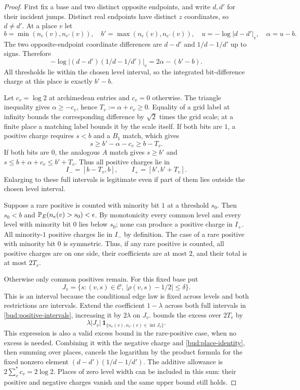 \begin{proof}
First fix a base and two distinct opposite endpoints, and write
$d,d'$ for their incident jumps.  Distinct real endpoints have
distinct $z$ coordinates, so $d\ne d'$.  At a place $v$ let
\[
 b=\min(n_e(v),n_{e'}(v)),\quad b'=\max(n_e(v),n_{e'}(v)),\quad
 u=-\log|d-d'|_v,\quad \alpha=u-b.
\]
The two opposite-endpoint coordinate differences are $d-d'$ and
$1/d-1/d'$ up to signs.  Therefore
\begin{equation}\label{bud:place-identity}
 -\log|(d-d')(1/d-1/d')|_v=2\alpha-(b'-b).
\end{equation}
All thresholds lie within the chosen level interval, so the
integrated bit-difference charge at this place is exactly $b'-b$.

Let $c_v=\log2$ at archimedean entries and $c_v=0$ otherwise.
The triangle inequality gives $\alpha\ge-c_v$, hence
$T_v:=\alpha+c_v\ge0$.  Equality of a grid label at infinity bounds
the corresponding difference by $\sqrt2$ times the grid scale;
at a finite place a matching label bounds it by the scale itself.
If both bits are $1$, a positive charge requires $s<b$ and a
$B_1$ match, which gives
\[
 s\ge b'-\alpha-c_v\ge b-T_v.
\]
If both bits are $0$, the analogous $A$ match gives
$s\ge b'$ and $s\le b+\alpha+c_v\le b'+T_v$.
Thus all positive charges lie in
\begin{equation}\label{bud:positive-intervals}
 I_-=[b-T_v,b],\qquad I_+=[b',b'+T_v].
\end{equation}
Enlarging to these full intervals is legitimate even if part of
them lies outside the chosen level interval.

Suppose a rare positive is counted with minority bit $1$ at a
threshold $s_0$.  Then $s_0<b$ and
$\mathbb P_E(n_e(v)>s_0)<\epsilon$.  By monotonicity every common level
and every level with minority bit $0$ lies below $s_0$; none can
produce a positive charge in $I_+$.  All minority-$1$ positive
charges lie in $I_-$ by definition.  The case of a rare positive
with minority bit $0$ is symmetric.  Thus, if any rare positive is
counted, all positive charges are on one side, their coefficients
are at most $2$, and their total is at most $2T_v$.

Otherwise only common positives remain.  For this fixed base put
\[
 J_v=\{s:(v,s)\in\mathcal C,\ |\rho(v,s)-1/2|\le\delta\}.
\]
This is an interval because the conditional edge law is fixed
across levels and both restrictions are intervals.  Extend the
coefficient $1-\lambda$ across both full intervals in
\eqref{bud:positive-intervals}, increasing it by $2\lambda$ on
$J_v$.   bounds the excess over $2T_v$ by
\[
 \lambda|J_v|\,
 \mathbf1_{\{n_e(v),n_{e'}(v)\in\operatorname{int}J_v\}}.
\]
This expression is also a valid excess bound in the rare-positive
case, when no excess is needed.  Combining it with the negative
charge and \eqref{bud:place-identity}, then summing over places,
cancels the logarithm by the product formula for the fixed nonzero
element $(d-d')(1/d-1/d')$.  The additive allowance is
$2\sum_v^*c_v=2\log2$.  Places of zero level width can be included
in this sum: their positive and negative charges vanish and the
same upper bound still holds.


\end{proof}
